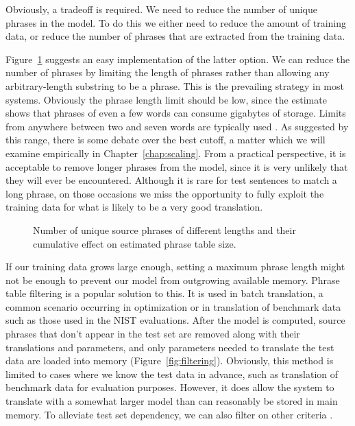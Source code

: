 Obviously, a tradeoff is required. We need to reduce the number of
unique phrases in the model.  To do this we either need to reduce the
amount of training data, or reduce the number of phrases that
are extracted from the training data.

Figure~\ref{fig:unique_source_phrases} suggests an easy implementation
of the latter option.  We can reduce the number of phrases by limiting
the length of phrases rather than allowing any arbitrary-length substring
to be a phrase.  This is the prevailing strategy in most systems.
Obviously the phrase length limit should be low, since the
estimate shows that phrases of even a few words can consume
gigabytes of storage.  Limits from anywhere between two and seven words
are typically used \citep{Ayan:2006:acl-coling,Koehn:2003:naacl,Zens:2007:hlt-naacl}.
As suggested by this range, there is some debate over the best cutoff, a matter
which we will examine empirically in Chapter~\ref{chap:scaling}.
From a practical perspective, it is acceptable
to remove longer phrases from the model, since it is very unlikely that
they will ever be encountered.  Although it is rare for test sentences to
match a long phrase, on those occasions we miss the opportunity
to fully exploit the training data for what is likely to be a very good
translation.

\figpreamble
\begin{figure}
	\figfontsize{
	\begin{center}
		
	\end{center}}
	\figpostamble
	\caption{Number of unique source phrases of different lengths and 
	their cumulative effect on estimated phrase table size.}
	\label{fig:unique_source_phrases}
\end{figure}

If our training data grows large enough, setting a maximum phrase
length might not be enough to prevent our model from outgrowing 
available memory. Phrase table filtering is a popular solution to this.
It is used in batch translation, a common scenario
occurring in optimization or in translation of benchmark
data such as those used in the NIST evaluations.  
After the model is computed, source phrases that
don't appear in the test set are removed along with their
translations and parameters, and only parameters needed to
translate the test data are loaded into memory 
(Figure~\ref{fig:filtering}).  Obviously, this method is limited
to cases where we know the test data in advance, such as 
translation of benchmark data for evaluation purposes.
However, it does allow the system to translate with a somewhat
larger model than can reasonably be stored in main memory.
To alleviate test set dependency, we can also filter on 
other criteria \citep{johnson:2007:emnlp-conll}.

